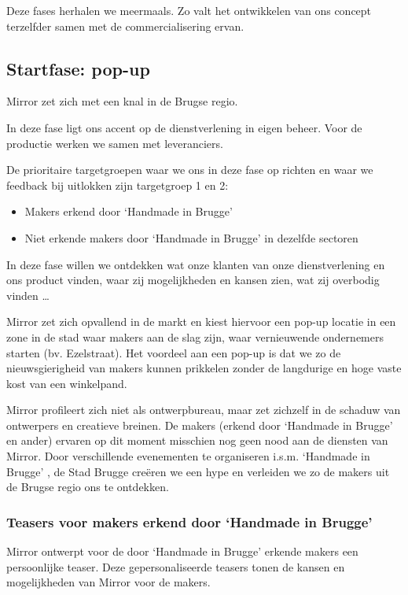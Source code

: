 Deze fases herhalen we meermaals. Zo valt het ontwikkelen van ons concept terzelfder samen met de commercialisering ervan.
\subsection{Startfase: pop-up} %
\label{sub:startfase_pop_up}
Mirror zet zich met een knal in de Brugse regio.

In deze fase ligt ons accent op de dienstverlening in eigen beheer. Voor de productie werken we samen met leveranciers.

De prioritaire targetgroepen waar we ons in deze fase op richten en waar we feedback bij uitlokken zijn targetgroep 1 en 2:

\begin{itemize}
  \item Makers erkend door `Handmade in Brugge'
  \item Niet erkende makers door `Handmade in Brugge' in dezelfde sectoren
\end{itemize}

In deze fase willen we ontdekken wat onze klanten van onze dienstverlening en ons product vinden, waar zij mogelijkheden en kansen zien, wat zij overbodig vinden …

Mirror zet zich opvallend in de markt en kiest hiervoor een pop-up locatie in een zone in de stad waar makers aan de slag zijn, waar vernieuwende ondernemers starten (bv. Ezelstraat). Het voordeel aan een pop-up is dat we zo de nieuwsgierigheid van makers kunnen prikkelen zonder de langdurige en hoge vaste kost van een winkelpand.

Mirror profileert zich niet als ontwerpbureau, maar zet zichzelf in de schaduw van ontwerpers en creatieve breinen.  De makers (erkend door `Handmade in Brugge' en ander) ervaren op dit moment misschien nog geen nood aan de diensten van Mirror. Door verschillende evenementen te organiseren i.s.m. `Handmade in Brugge' , de Stad Brugge creëren we een hype en verleiden we zo de makers uit de Brugse regio ons te ontdekken.

\subsubsection{Teasers voor makers erkend door `Handmade in Brugge'} %
\label{ssub:teasers_voor_makers_erkend_door_handmade_in_brugge}

Mirror ontwerpt voor de door `Handmade in Brugge' erkende makers een persoonlijke teaser. Deze gepersonaliseerde teasers tonen de kansen en mogelijkheden van Mirror voor de makers.


